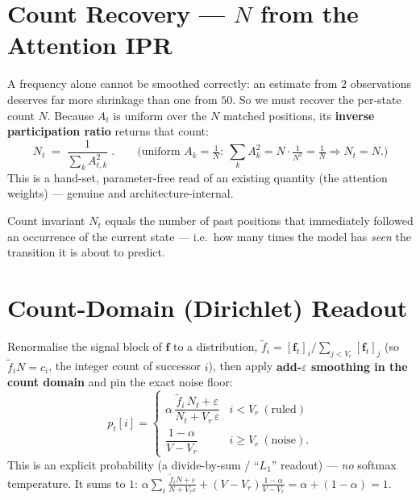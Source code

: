 \documentclass[11pt]{article}
\newcommand{\fvec}{\mathbf{f}}
\begin{document}
\section{Count Recovery --- $N$ from the Attention IPR}
\label{sec:count}
A frequency alone cannot be smoothed correctly: an estimate from $2$ observations deserves far more
shrinkage than one from $50$. So we must recover the per-state count $N$. Because $A_t$ is uniform over
the $N$ matched positions, its \textbf{inverse participation ratio} returns that count:
\begin{equation}
N_t \;=\; \frac{1}{\sum_{k} A_{t,k}^2}\;.\qquad
\Big(\text{uniform } A_k=\tfrac1N:\ \textstyle\sum_k A_k^2=N\cdot\tfrac1{N^2}=\tfrac1N\Rightarrow N_t=N.\Big)
\end{equation}
This is a hand-set, parameter-free read of an existing quantity (the attention weights) --- genuine and
architecture-internal.
\begin{invbox}{Count invariant}
$N_t$ equals the number of past positions that immediately followed an occurrence of the current state
--- i.e.\ how many times the model has \emph{seen} the transition it is about to predict.
\end{invbox}

\section{Count-Domain (Dirichlet) Readout}
\label{sec:readout}
Renormalise the signal block of $\fvec$ to a distribution, $\tilde f_i=[\fvec_t]_i/\sum_{j<V_r}[\fvec_t]_j$
(so $\tilde f_i N=c_i$, the integer count of successor $i$), then apply \textbf{add-$\varepsilon$
smoothing in the count domain} and pin the exact noise floor:
\begin{equation}
p_t[i]=
\begin{cases}
\alpha\,\dfrac{\tilde f_i\,N_t+\varepsilon}{N_t+V_r\,\varepsilon} & i<V_r\ (\text{ruled})\\[10pt]
\dfrac{1-\alpha}{V-V_r} & i\ge V_r\ (\text{noise}).
\end{cases}
\end{equation}
This is an explicit probability (a divide-by-sum / ``$L_1$'' readout) --- \emph{no} softmax temperature.
It sums to $1$: $\alpha\sum_i\frac{\tilde f_iN+\varepsilon}{N+V_r\varepsilon}+(V-V_r)\frac{1-\alpha}{V-V_r}
=\alpha+(1-\alpha)=1$.
\end{document}
